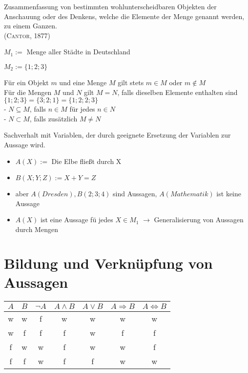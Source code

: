 \begin{mydef}[Menge]
	Zusammenfassung von bestimmten wohlunterscheidbaren Objekten der Anschauung oder des Denkens, welche die Elemente der Menge genannt werden, zu einem Ganzen.\\ (\textsc{Cantor}, 1877)
\end{mydef}

\begin{exmp}
	\item $M_1 :=$ Menge aller Städte in Deutschland
	\item $M_2 := \{1;2;3\}$
\end{exmp}
 
Für ein Objekt $m$ und eine Menge $M$ gilt stets $m \in M$ oder $m \notin M$ \\
Für die Mengen $M$ und $N$ gilt $M=N$, falls dieselben Elemente enthalten sind 
$\{1;2;3\} = \{3;2;1\} = \{1;2;2;3\}$ \\
- $N \subseteq M$, falls $n \in M$ für jedes $n \in N$ \\
- $N \subset M$, falls zusätzlich $M \neq N$ \\

\begin{mydef}[Aussageform]
	Sachverhalt mit Variablen, der durch geeignete Ersetzung der Variablen zur Aussage wird.
\end{mydef}

\begin{exmp}
	\begin{itemize}
		\item $A(X) := $ Die Elbe fließt durch X
		\item $B(X;Y;Z) := X + Y = Z$
		\item aber $A(Dresden) ,B(2;3;4)$ sind Aussagen, $A(Mathematik)$ ist keine Aussage
		\item $A(X)$ ist eine Aussage f\"u jedes $X \in M_1$ $\to$ Generalisierung von Aussagen durch Mengen
	\end{itemize}
\end{exmp}

\section*{Bildung und Verknüpfung von Aussagen}

\begin{tabular}{|c|c|c|c|c|c|c|}
	\hline
	$A$ & $B$ & $\lnot A$ & $A \land B$ & $A \lor B$ & $A \Rightarrow B$ & $A \iff B$\\
	\hline
	w & w & f & w & w & w & w\\
	\hline
	w & f & f & f & w & f & f\\
	\hline
	f & w & w & f & w & w & f\\
	\hline
	f & f & w & f & f & w & w\\
	\hline
\end{tabular}

